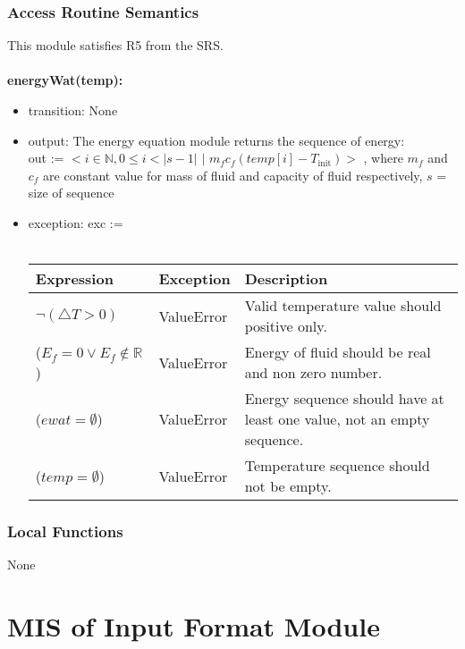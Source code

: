 \documentclass[12pt, titlepage]{article}
\begin{document}
\subsubsection{Access Routine Semantics}
This module satisfies R5 from the SRS. \\ \\
\noindent \textbf{energyWat(temp):}
\begin{itemize}
\item transition: None
\item output: The energy equation module returns the sequence of energy: \\ out := $ < i \in \mathbb{N}, 0 \le i < |s-1|$ $ | $ $m_f c_f (temp[i] - T_\text{init}) > $  , where $m_f$ and $c_f$ are constant value for mass of fluid and capacity of fluid respectively, $s$ = size of sequence

\item exception: exc := \\ \\
 \begin{tabular}{p{5cm} p{3.5cm} p{5.5cm}}
 \hline
 \textbf{Expression} & \textbf{Exception} & \textbf{Description} \\
  \hline
  $\neg ( \triangle T > 0 ) $ & ValueError & Valid temperature value should positive only. \\ 
  \hline
    ($E_f = 0 \vee E_f \notin \mathbb{R}$) & ValueError & Energy of fluid should be real and non zero number.   \\
    \hline 
        ($ewat = \emptyset $) & ValueError & Energy sequence should have at least one value, not an empty sequence. \\ 
    \hline
    ($temp = \emptyset $) & ValueError & Temperature sequence should not be empty. \\ 
    \hline
 \end{tabular}
 
\end{itemize}

\subsubsection{Local Functions}

None

\newpage

\section{MIS of Input Format Module} \label{Input_Format_Module} 
\end{document}
